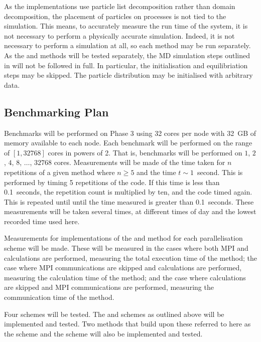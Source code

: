 %
As the implementations use particle list decomposition rather
than domain decomposition, the placement of particles on
processes is not tied to the simulation.
%
This means, to accurately measure the run time of the system,
it is not necessary to perform a physically accurate simulation.
%
Indeed, it is not necessary to perform a simulation at all,
so each method may be run separately.
%
As the \individualoperation{} and \pairoperation{} methods will
be tested separately, the MD simulation steps outlined in
will not be followed in full.
%
In particular, the initialisation and equilibriation steps may
be skipped.
%
The particle distribution may be initialised with arbitrary data.


\subsection{Benchmarking Plan}

Benchmarks will be performed on \hector{} Phase 3 using
32 cores per node with 32~GB of memory available to each node.
%
Each benchmark will be performed on the range of $[1,32768]$ cores
in powers of 2.
%
That is, benchmarks will be performed on
$1$, $2$, $4$, $8$, $\dots{}$, $32768$ cores.
%
Measurements will be made of the time taken for $n$ repetitions of a given
method where $n \ge{} 5$ and the time $t \sim{} 1$~second.
%
This is performed by timing 5 repetitions of the code.
%
If this time is less than 0.1~seconds, the repetition count is
multiplied by ten, and the code timed again.
%
This is repeated until until the time measured is greater than 0.1~seconds.
%
These measurements will be taken several times, at different times of
day and the lowest recorded time used here.

Measurements for implementations of
the \individualoperation{} and \pairoperation{} method
for each parallelisation scheme will be made.
%
These will be measured in the cases where both MPI and calculations
are performed, measuring the total execution time of the method;
the case where MPI communications are skipped and calculations are
performed, measuring the calculation time of the method; and
the case where calculations are skipped and MPI communications are
performed, measuring the communication time of the method.

Four schemes will be tested.
%
The \replicateddata{} and \systolicloop{} schemes as outlined above
will be implemented and tested.
%
Two methods that build upon these referred to here as
the \sharedandreplicateddata{} scheme and the \replicatedsystolicloop{} scheme
will also be implemented and tested.

